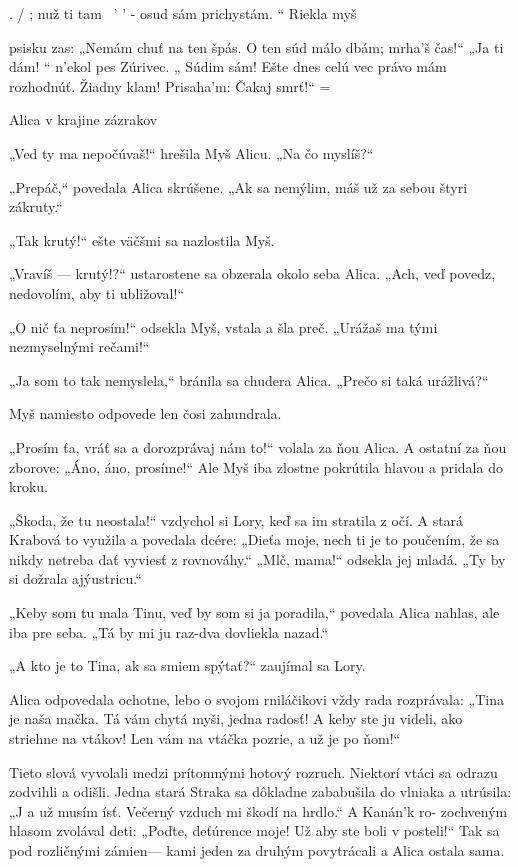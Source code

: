 \documentclass[12pt]{article}
\begin{document}
\begin{Parallel}[p]{}{}
{{. / ;
nuž ti tam \ ' ' -
osud sám
prichystám. “
Riekla myš

psisku zas:
„Nemám chuť
na ten špás.
O ten súd
málo dbám;
mrha'š čas!“
„Ja ti dám! “
n'ekol pes
Zúrivec.
„ Súdim sám!
Ešte dnes
celú vec
právo mám
rozhodnúť.
Žiadny klam!
Prisaha'm:
Čakaj smrť!“ =

   

 

 

 

Alica v krajine zázrakov

„Ved ty ma nepočúvaš!“ hrešila Myš Alicu. „Na čo
myslíš?“

„Prepáč,“ povedala Alica skrúšene. „Ak sa nemýlim, máš
už za sebou štyri zákruty.“

„Tak krutý!“ ešte väčšmi sa nazlostila Myš.

„Vravíš — krutý!?“ ustarostene sa obzerala okolo seba
Alica. „Ach, veď povedz, nedovolím, aby ti ubližoval!“

„O nič ťa neprosím!“ odsekla Myš, vstala a šla preč.
„Urážaš ma tými nezmyselnými rečami!“

„Ja som to tak nemyslela,“ bránila sa chudera Alica.
„Prečo si taká urážlivá?“

Myš namiesto odpovede len čosi zahundrala.

„Prosím ťa, vráť sa a dorozprávaj nám to!“ volala za ňou
Alica. A ostatní za ňou zborove: „Áno, áno, prosíme!“ Ale
Myš iba zlostne pokrútila hlavou a pridala do kroku.

„Škoda, že tu neostala!“ vzdychol si Lory, keď sa im
stratila z očí. A stará Krabová to využila a povedala dcére:
„Dieťa moje, nech ti je to poučením, že sa nikdy netreba dať
vyviesť z rovnováhy.“ „Mlč, mama!“ odsekla jej mladá. „Ty
by si dožrala ajýustricu.“

„Keby som tu mala Tinu, veď by som si ja poradila,“
povedala Alica nahlas, ale iba pre seba. „Tá by mi ju
raz-dva dovliekla nazad.“

„A kto je to Tina, ak sa smiem spýtať?“ zaujímal sa
Lory.

Alica odpovedala ochotne, lebo o svojom rniláčikovi vždy
rada rozprávala: „Tina je naša mačka. Tá vám chytá myši,
jedna radosť! A keby ste ju videli, ako striehne na vtákov!
Len vám na vtáčka pozrie, a už je po ňom!“

Tieto slová vyvolali medzi prítomnými hotový rozruch.
Niektorí vtáci sa odrazu zodvihli a odišli. Jedna stará Straka
sa dôkladne zababušila do vlniaka a utrúsila: „J a už musím
ísť. Večerný vzduch mi škodí na hrdlo.“ A Kanán'k ro-
zochveným hlasom zvolával deti: „Poďte, deťúrence moje!
Už aby ste boli v posteli!“ Tak sa pod rozličnými zámien—
kami jeden za druhým povytrácali a Alica ostala sama.

}}
\end{Parallel}
\end{document}
